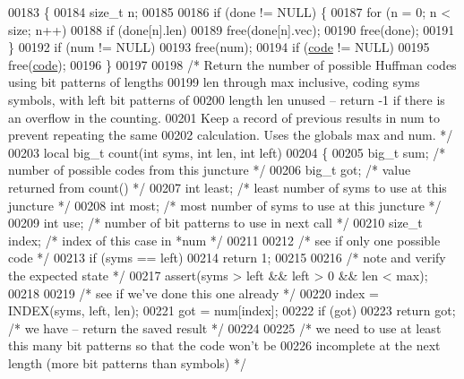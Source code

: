 \begin{DoxyCode}
00183 \{
00184     \textcolor{keywordtype}{size\_t} n;
00185 
00186     \textcolor{keywordflow}{if} (done != NULL) \{
00187         \textcolor{keywordflow}{for} (n = 0; n < size; n++)
00188             \textcolor{keywordflow}{if} (done[n].len)
00189                 free(done[n].vec);
00190         free(done);
00191     \}
00192     \textcolor{keywordflow}{if} (num != NULL)
00193         free(num);
00194     \textcolor{keywordflow}{if} (\hyperlink{structcode}{code} != NULL)
00195         free(\hyperlink{structcode}{code});
00196 \}
00197 
00198 \textcolor{comment}{/* Return the number of possible Huffman codes using bit patterns of lengths}
00199 \textcolor{comment}{   len through max inclusive, coding syms symbols, with left bit patterns of}
00200 \textcolor{comment}{   length len unused -- return -1 if there is an overflow in the counting.}
00201 \textcolor{comment}{   Keep a record of previous results in num to prevent repeating the same}
00202 \textcolor{comment}{   calculation.  Uses the globals max and num. */}
00203 local big\_t count(\textcolor{keywordtype}{int} syms, \textcolor{keywordtype}{int} len, \textcolor{keywordtype}{int} left)
00204 \{
00205     big\_t sum;          \textcolor{comment}{/* number of possible codes from this juncture */}
00206     big\_t got;          \textcolor{comment}{/* value returned from count() */}
00207     \textcolor{keywordtype}{int} least;          \textcolor{comment}{/* least number of syms to use at this juncture */}
00208     \textcolor{keywordtype}{int} most;           \textcolor{comment}{/* most number of syms to use at this juncture */}
00209     \textcolor{keywordtype}{int} use;            \textcolor{comment}{/* number of bit patterns to use in next call */}
00210     \textcolor{keywordtype}{size\_t} index;       \textcolor{comment}{/* index of this case in *num */}
00211 
00212     \textcolor{comment}{/* see if only one possible code */}
00213     \textcolor{keywordflow}{if} (syms == left)
00214         \textcolor{keywordflow}{return} 1;
00215 
00216     \textcolor{comment}{/* note and verify the expected state */}
00217     assert(syms > left && left > 0 && len < max);
00218 
00219     \textcolor{comment}{/* see if we've done this one already */}
00220     index = INDEX(syms, left, len);
00221     got = num[index];
00222     \textcolor{keywordflow}{if} (got)
00223         \textcolor{keywordflow}{return} got;         \textcolor{comment}{/* we have -- return the saved result */}
00224 
00225     \textcolor{comment}{/* we need to use at least this many bit patterns so that the code won't be}
00226 \textcolor{comment}{       incomplete at the next length (more bit patterns than symbols) */}

\end{DoxyCode}
